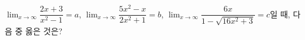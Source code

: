 $\displaystyle\lim_{x\to\infty}\dfrac{2x+3}{x^2-1}=a$, $\displaystyle\lim_{x\to\infty}\dfrac{5x^2-x}{2x^2+1}=b$, $\displaystyle\lim_{x\to\infty}\dfrac{6x}{1-\sqrt{16x^2+3}}=c$일 때, 다음 중 옳은 것은?

